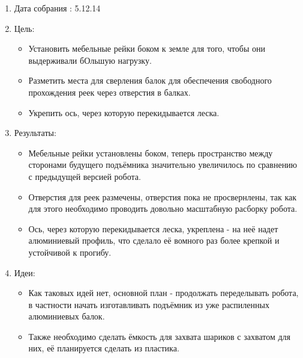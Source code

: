 
  \begin{enumerate}
    \item Дата собрания : 5.12.14
    \item Цель:
    \begin{itemize}
      \item Установить мебельные рейки боком к земле для того, чтобы они выдерживали бОльшую нагрузку.
      \item Разметить места для сверления балок для обеспечения свободного прохождения реек через отверстия в балках.
      \item Укрепить ось, через которую перекидывается леска.
    \end{itemize}
    \item Результаты:
    \begin{itemize}
      \item Мебельные рейки установлены боком, теперь пространство между сторонами будущего подъёмника значительно увеличилось по сравнению с предыдущей версией робота.
      \item Отверстия для реек размечены, отверстия пока не просвернлены, так как для этого необходимо проводить довольно масштабную расборку робота.
      \item Ось, через которую перекидывается леска, укреплена - на неё надет алюминиевый профиль, что сделало её вомного раз более крепкой и устойчивой к прогибу.
    \end{itemize} 
    \item Идеи:
    \begin{itemize}
    	\item Как таковых идей нет, основной план - продолжать переделывать робота, в частности начать изготавливать подъёмник из уже распиленных алюминиевых балок.
    	\item Также необходимо сделать ёмкость для захвата шариков с захватом для них, её планируется сделать из пластика.
    \end{itemize}
   \end{enumerate} 
\fillpage